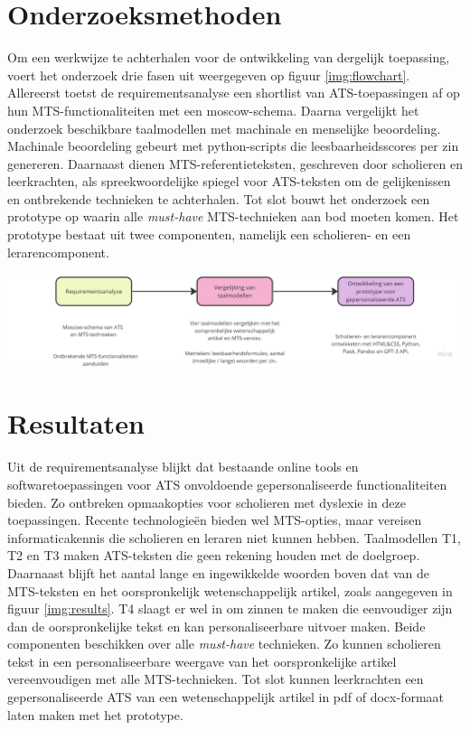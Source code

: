 \documentclass[a0,portrait]{hogent-poster}
\begin{document}
\begin{multicols}{2}
\section{Onderzoeksmethoden}

Om een werkwijze te achterhalen voor de ontwikkeling van dergelijk toepassing, voert het onderzoek drie fasen uit weergegeven op figuur \ref{img:flowchart}. Allereerst toetst de requirementsanalyse een shortlist van ATS-toepassingen af op hun MTS-functionaliteiten met een moscow-schema. Daarna vergelijkt het onderzoek beschikbare taalmodellen met machinale en menselijke beoordeling. Machinale beoordeling gebeurt met python-scripts die leesbaarheidsscores per zin genereren. Daarnaast dienen MTS-referentieteksten, geschreven door scholieren en leerkrachten, als spreekwoordelijke spiegel voor ATS-teksten om de gelijkenissen en ontbrekende technieken te achterhalen. Tot slot bouwt het onderzoek een prototype op waarin alle \textit{must-have} MTS-technieken aan bod moeten komen. Het prototype bestaat uit twee componenten, namelijk een scholieren- en een lerarencomponent.

\begin{center}
	\captionsetup{type=figure}
	\includegraphics[width=1.0\linewidth]{figures/onderzoeksmethoden.jpg}
	\label{img:flowchart}
\end{center}

\section{Resultaten}

Uit de requirementsanalyse blijkt dat bestaande online tools en softwaretoepassingen voor ATS onvoldoende gepersonaliseerde functionaliteiten bieden. Zo ontbreken opmaakopties voor scholieren met dyslexie in deze toepassingen. Recente technologieën bieden wel MTS-opties, maar vereisen informaticakennis die scholieren en leraren niet kunnen hebben. Taalmodellen T1, T2 en T3 maken ATS-teksten die geen rekening houden met de doelgroep. Daarnaast blijft het aantal lange en ingewikkelde woorden boven dat van de MTS-teksten en het oorspronkelijk wetenschappelijk artikel, zoals aangegeven in figuur \ref{img:results}. T4 slaagt er wel in om zinnen te maken die eenvoudiger zijn dan de oorspronkelijke tekst en kan personaliseerbare uitvoer maken. Beide componenten beschikken over alle \textit{must-have} technieken. Zo kunnen scholieren tekst in een personaliseerbare weergave van het oorspronkelijke artikel vereenvoudigen met alle MTS-technieken. Tot slot kunnen leerkrachten een gepersonaliseerde ATS van een wetenschappelijk artikel in pdf of docx-formaat laten maken met het prototype.


\end{multicols}
\end{document}
